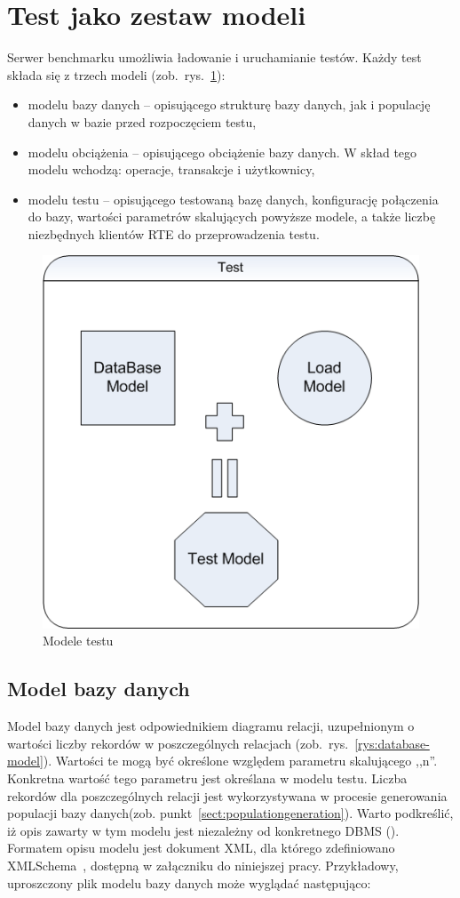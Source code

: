 \section{Test jako zestaw modeli}
Serwer benchmarku umożliwia ładowanie i uruchamianie testów. Każdy test składa się z trzech modeli (zob.~rys.~\ref{rys:models}):
\begin{itemize}
\item modelu bazy danych -- opisującego strukturę bazy danych, jak i populację danych w bazie przed rozpoczęciem testu,
\item modelu obciążenia -- opisującego obciążenie bazy danych. W skład tego modelu wchodzą: operacje, transakcje i użytkownicy,
\item modelu testu -- opisującego testowaną bazę danych, konfigurację połączenia do bazy, wartości parametrów skalujących 
powyższe modele, a także liczbę niezbędnych klientów RTE do przeprowadzenia testu.
\end{itemize}
\begin{figure}[h]
\begin{center}
\includegraphics[width=0.4\linewidth]{figures/models.png}
\end{center}
\caption{Modele testu}\label{rys:models}
\end{figure}

\subsection{Model bazy danych}
Model bazy danych jest odpowiednikiem diagramu relacji, uzupełnionym o wartości 
liczby rekordów w poszczególnych relacjach (zob.~rys.~\ref{rys:database-model}). 
Wartości te mogą być określone względem parametru skalującego ,,n''. 
Konkretna wartość tego parametru jest określana w modelu testu. 
Liczba rekordów dla poszczególnych relacji jest wykorzystywana w procesie
generowania populacji bazy danych(zob. punkt~\ref{sect:populationgeneration}).
Warto podkreślić, iż opis zawarty w tym modelu jest niezależny od konkretnego DBMS 
(). Formatem opisu modelu jest dokument XML,
dla którego zdefiniowano XMLSchema~\cite{XmlSchema1}, dostępną w załączniku do niniejszej pracy.
Przykładowy, uproszczony plik modelu bazy danych może wyglądać następująco:

